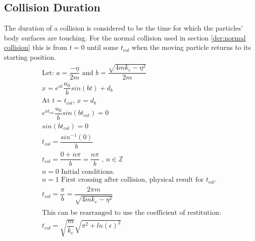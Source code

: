 \documentclass[10pt,a4paper,titlepage]{report}
\begin{document}
\subsection{Collision Duration}
\label{der:collision duration}
The duration of a collision is considered to be the time for which the particles' body surfaces are touching. For the normal collision used in section \ref{der:normal collision} this is from $t = 0$ until some $t_{col}$ when the moving particle returns to its starting position.
\begin{align*}
&\text{Let: } a = \dfrac{-\eta}{2m} \text{ and } b = \dfrac{\sqrt{4mk_e - \eta ^ 2}}{2m} \\
&x = e^{at} \dfrac{u_0}{b} sin(bt) + d_b \\
&\text{At $t = t_{col}$, $x = d_b$} \\
&e^{a t_{col}} \dfrac{u_0}{b} sin(b t_{col}) = 0 \\
&sin(bt_{col}) = 0 \\
&t_{col} = \dfrac{sin^{-1}(0)}{b} \\
&t_{col} = \dfrac{0 + n \pi}{b} = \dfrac{n \pi}{b} \text{ , } n \in \mathbb{Z} \\
&n = 0 \text{ Initial conditions.} \\
&n = 1 \text{ First crossing after collision, physical result for $t_{col}$.} \\
&t_{col} = \dfrac{\pi}{b} = \dfrac{2 \pi m}{\sqrt{4 m k_e - \eta ^ 2}} \\\\
&\text{This can be rearranged to use the coefficient of restitution:} \\
&t_{col} = \sqrt{\dfrac{m}{k_e}}\sqrt{\pi^2 + ln(\epsilon)^2}
\end{align*}
\end{document}
